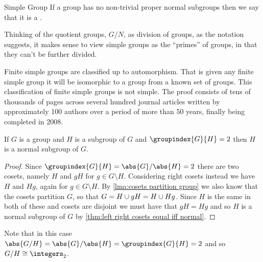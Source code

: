 \begin{dfn}{Simple Group}{}
    If a group has no non-trivial proper normal subgroups then we say that it is a .
\end{dfn}

Thinking of the quotient groups, \(G/N\), as division of groups, as the notation suggests, it makes sense to view simple groups as the \enquote{primes} of groups, in that they can't be further divided.

Finite simple groups are classified up to automorphism.
That is given any finite simple group it will be isomorphic to a group from a known set of groups.
This classification of finite simple groups is not simple.
The proof consists of tens of thousands of pages across several hundred journal articles written by approximately 100 authors over a period of more than 50 years, finally being completed in 2008.

\begin{thm}{}{}
    If \(G\) is a group and \(H\) is a subgroup of \(G\) and \(\groupindex{G}{H} = 2\) then \(H\) is a normal subgroup of \(G\).
    \begin{proof}
        Since \(\groupindex{G}{H} = \abs{G}/\abs{H} = 2\) there are two cosets, namely \(H\) and \(gH\) for \(g \in G \setminus H\).
        Considering right cosets instead we have \(H\) and \(Hg\), again for \(g \in G \setminus H\).
        By \cref{lma:cosets partition group} we also know that the cosets partition \(G\), so that \(G = H \cup gH = H \cup Hg\).
        Since \(H\) is the same in both of these and cosets are disjoint we must have that \(gH = Hg\) and so \(H\) is a normal subgroup of \(G\) by \cref{thm:left right cosets equal iff normal}.
    \end{proof}
\end{thm}

Note that in this case \(\abs{G/H} = \abs{G}/\abs{H} = \groupindex{G}{H} = 2\) and so \(G/H \isomorphic \integers_2\).

